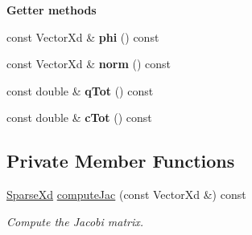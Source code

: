 \begin{Indent}{\bf Getter methods}\par
\begin{DoxyCompactItemize}
\item 
\hypertarget{classNonLinearPoisson1D_acbe945a7e028306e53fa2b121ddadc7a}{const Vector\-Xd \& {\bfseries phi} () const }\label{classNonLinearPoisson1D_acbe945a7e028306e53fa2b121ddadc7a}

\item 
\hypertarget{classNonLinearPoisson1D_a690be2163ccaff066191959fd1f413ed}{const Vector\-Xd \& {\bfseries norm} () const }\label{classNonLinearPoisson1D_a690be2163ccaff066191959fd1f413ed}

\item 
\hypertarget{classNonLinearPoisson1D_ad8d751396b67e23d237e90b7072a1db2}{const double \& {\bfseries q\-Tot} () const }\label{classNonLinearPoisson1D_ad8d751396b67e23d237e90b7072a1db2}

\item 
\hypertarget{classNonLinearPoisson1D_a01d78f24af67b4721fa1fe3c456285d8}{const double \& {\bfseries c\-Tot} () const }\label{classNonLinearPoisson1D_a01d78f24af67b4721fa1fe3c456285d8}

\end{DoxyCompactItemize}
\end{Indent}
\subsection*{Private Member Functions}
\begin{DoxyCompactItemize}
\item 
\hyperlink{typedefs_8h_a86edf437f454f4dd79d5422366403b7f}{Sparse\-Xd} \hyperlink{classNonLinearPoisson1D_a68da1b47bb6eb20a50057e8b35a4c09f}{compute\-Jac} (const Vector\-Xd \&) const 
\begin{DoxyCompactList}\small\item\em Compute the Jacobi matrix. \end{DoxyCompactList}\end{DoxyCompactItemize}
